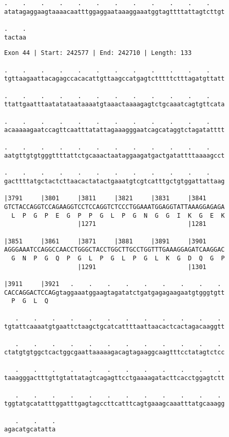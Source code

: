 \documentclass{article}
\begin{document}
\newpage
\begin{Verbatim}[fontfamily=courier]
.    .    .    .    .    .    .    .    .    .    .    .    
atatagaggaagtaaaacaatttggaggaataaaggaaatggtagttttattagtcttgt

.    .
tactaa
\end{Verbatim}
\newpage
\begin{Verbatim}[fontfamily=courier]
Exon 44 | Start: 242577 | End: 242710 | Length: 133

.    .    .    .    .    .    .    .    .    .    .    .    
tgttaagaattacagagccacacattgttaagccatgagtctttttctttagatgttatt

.    .    .    .    .    .    .    .    .    .    .    .    
ttattgaatttaatatataataaaatgtaaactaaaagagtctgcaaatcagtgttcata

.    .    .    .    .    .    .    .    .    .    .    .    
acaaaaagaatccagttcaatttatattagaaagggaatcagcataggtctagatatttt

.    .    .    .    .    .    .    .    .    .    .    .    
aatgttgtgtgggttttattctgcaaactaataggaagatgactgatattttaaaagcct

.    .    .    .    .    .    .    .    .    .    .    .    
gacttttatgctactcttaacactatactgaaatgtcgtcatttgctgtggattattaag

|3791     |3801     |3811     |3821     |3831     |3841     
GTCTACCAGGTCCAGAAGGTCCTCCAGGTCTCCCTGGAAATGGAGGTATTAAAGGAGAGA
  L  P  G  P  E  G  P  P  G  L  P  G  N  G  G  I  K  G  E  K
                    |1271                         |1281     

|3851     |3861     |3871     |3881     |3891     |3901     
AGGGAAATCCAGGCCAACCTGGGCTACCTGGCTTGCCTGGTTTGAAAGGAGATCAAGGAC
  G  N  P  G  Q  P  G  L  P  G  L  P  G  L  K  G  D  Q  G  P
                    |1291                         |1301     

|3911     |3921   .    .    .    .    .    .    .    .    . 
CACCAGGACTCCAGgtaggaaatggaagtagatatctgatgagagaagaatgtgggtgtt
  P  G  L  Q                                                

   .    .    .    .    .    .    .    .    .    .    .    . 
tgtattcaaaatgtgaattctaagctgcatcattttaattaacactcactagacaaggtt

   .    .    .    .    .    .    .    .    .    .    .    . 
ctatgtgtggctcactggcgaattaaaaagacagtagaaggcaagtttcctatagtctcc

   .    .    .    .    .    .    .    .    .    .    .    . 
taaagggactttgttgtattatagtcagagttcctgaaaagatacttcacctggagtctt

   .    .    .    .    .    .    .    .    .    .    .    . 
tggtatgcatatttggatttgagtagccttcatttcagtgaaagcaaatttatgcaaagg

   .    .    .
agacatgcatatta
\end{Verbatim}
\end{document}
